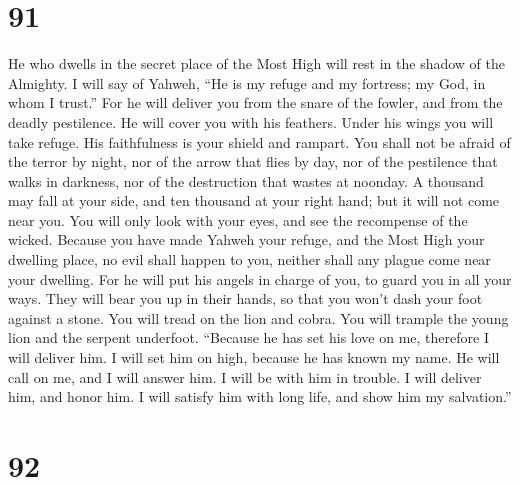 \hypertarget{section-83}{%
\section{91}\label{section-83}}

 He who dwells in the secret place of the Most High will
rest in the shadow of the Almighty.  I will say of Yahweh,
``He is my refuge and my fortress; my God, in whom I trust.''
 For he will deliver you from the snare of the fowler, and
from the deadly pestilence.  He will cover you with his
feathers. Under his wings you will take refuge. His faithfulness is your
shield and rampart.  You shall not be afraid of the terror
by night, nor of the arrow that flies by day,  nor of the
pestilence that walks in darkness, nor of the destruction that wastes at
noonday.  A thousand may fall at your side, and ten
thousand at your right hand; but it will not come near you.
 You will only look with your eyes, and see the recompense
of the wicked.  Because you have made Yahweh your refuge,
and the Most High your dwelling place,  no evil shall
happen to you, neither shall any plague come near your dwelling.
 For he will put his angels in charge of you, to guard
you in all your ways.  They will bear you up in their
hands, so that you won't dash your foot against a stone. 
You will tread on the lion and cobra. You will trample the young lion
and the serpent underfoot.  ``Because he has set his love
on me, therefore I will deliver him. I will set him on high, because he
has known my name.  He will call on me, and I will answer
him. I will be with him in trouble. I will deliver him, and honor him.
 I will satisfy him with long life, and show him my
salvation.''

\hypertarget{section-84}{%
\section{92}\label{section-84}}

